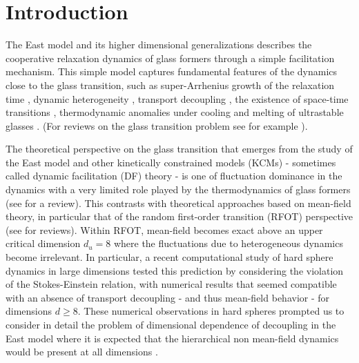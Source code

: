 \documentclass[showpacs,pre,aps,twocolumn,superscriptaddress]{revtex4-1}
\begin{document}
\section{Introduction}
The East model and its higher dimensional generalizations 
\cite{Jackle1991,Ritort2003,Berthier2005,Ashton2005} 
describes the cooperative relaxation dynamics of glass formers through a simple facilitation mechanism.  This simple model captures fundamental features of the dynamics close to the glass transition, such as super-Arrhenius growth of the relaxation time \cite{Sollich1999}, dynamic heterogeneity \cite{Garrahan2002}, transport decoupling \cite{Jung2004,Jung2005,Berthier2005E,Blondel2014}, the existence of space-time transitions \cite{Merolle2005,Garrahan2007}, thermodynamic anomalies under cooling \cite{Keys2013} and melting of ultrastable glasses \cite{Gutierrez2016}.  (For reviews on the glass transition problem see for example \cite{Ediger1996,Berthier2011,Biroli2013}).  

The theoretical perspective on the glass transition that emerges from the study of the East model and other kinetically constrained models (KCMs) - sometimes called dynamic facilitation (DF) theory - is one of fluctuation dominance in the dynamics with a very limited role played by the thermodynamics of glass formers (see \cite{Chandler2010} for a review).  This contrasts with theoretical approaches based on mean-field theory, in particular that of the random first-order transition (RFOT) perspective (see \cite{Lubchenko2007,Parisi2010} for reviews).  Within RFOT, mean-field becomes exact above an upper critical dimension $d_u=8$ \cite{Biroli2007,Franz2011,Franz2012} where the fluctuations due to heterogeneous dynamics become irrelevant.  In particular, a recent computational study of hard sphere dynamics in large dimensions 
\cite{Charbonneau2012-2} tested this prediction by considering the violation of the Stokes-Einstein relation, with numerical results that seemed compatible with an absence of transport decoupling - and thus mean-field behavior - for dimensions $d \geq 8$.   These numerical observations in hard spheres prompted us to consider in detail the problem of dimensional dependence of decoupling in the East model where it is expected that the hierarchical non mean-field dynamics would be present at all dimensions \cite{Ashton2005}. 
\end{document}
